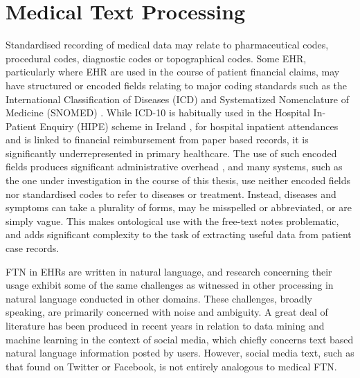


\section{Medical Text Processing}
\label{section-rr-medical-text}





Standardised recording of medical data may relate to pharmaceutical codes, procedural codes, diagnostic codes or topographical codes. Some EHR, particularly where EHR are used in the course of patient financial claims, may have structured or encoded fields relating to major coding standards such as the International Classification of Diseases (ICD) and Systematized Nomenclature of Medicine (SNOMED) \cite{kharrazi2018value}. While ICD-10 is habitually used in the Hospital In-Patient
Enquiry (HIPE) scheme in Ireland \cite{hipe2018}, for hospital inpatient attendances and is linked to financial reimbursement from paper based records, it is significantly underrepresented in primary healthcare. The use of such encoded fields produces significant administrative overhead \cite{goroll2017emerging}, and many systems, such as the one under investigation in the course of this thesis, use neither encoded fields nor standardised codes to refer to diseases or treatment. Instead, diseases and symptoms can take a plurality of forms, may be misspelled or abbreviated, or are simply vague. This makes ontological use with the free-text notes problematic, and adds significant complexity to the task of extracting useful data from patient case records.

FTN in EHRs are written in natural language, and research concerning their usage exhibit some of the same challenges as witnessed in other processing in natural language conducted in other domains. These challenges, broadly speaking, are primarily concerned with noise and ambiguity. A great deal of literature has been produced in recent years in relation to data mining and machine learning in  the context of social media, which chiefly concerns text based natural language information posted by users. However, social media text, such as that found on Twitter or Facebook, is not entirely analogous to medical FTN. 


